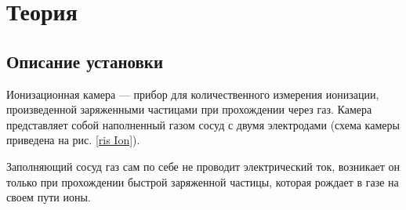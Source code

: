 

\newcommand{\formula}[2]
{
    \begin{equation}\label{#1}
        #2
    \end{equation}
}

\newcommand{\mth}[1]
{
    \begin{math}
        #1
    \end{math}
}

\newcommand{\ruB}[1]
{
    _{\text{#1}}
}

\setcounter{PicsCounter}{1}

\newcommand{\pic}[3]{
    \begin{center}
        \begin{minipage}[h!]{#1}
            \begin{center}

                \texttt{[image: \#2]}
                \textit{Рис \arabic{PicsCounter}. #3}

            \end{center}
        \end{minipage}
    \end{center}

    \stepcounter{PicsCounter}
}

\setcounter{TablesCounter}{1}

\newcommand{\tableLable}[1]{
    \textit{Таблица \arabic{TablesCounter}: #1}

    \stepcounter{TablesCounter}
}

\section{Теория}

\subsection{Описание установки}

Ионизационная камера --- прибор для количественного измерения
ионизации, произведенной заряженными частицами при прохождении
через газ. Камера представляет собой наполненный газом сосуд с двумя электродами (схема камеры приведена на рис. \ref{ris Ion}). 

Заполняющий сосуд газ сам по себе не проводит электрический ток, возникает он только при прохождении быстрой заряженной частицы, которая рождает в газе на своем пути ионы.

